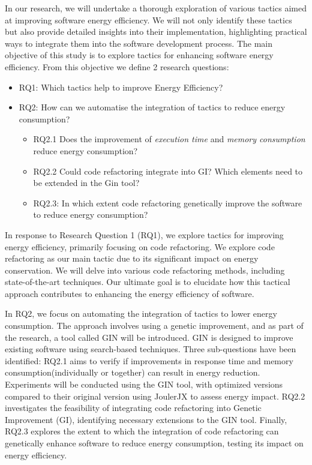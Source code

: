 In our research, we will undertake a thorough exploration of various tactics aimed at improving software energy efficiency. We will not only identify these tactics but also provide detailed insights into their implementation, highlighting practical ways to integrate them into the software development process. The main objective of this study is to explore tactics for enhancing software energy efficiency. From this objective we define 2 research questions:
\begin{itemize}
    \item RQ1: Which tactics help to improve Energy Efficiency?
    \item RQ2: How can we automatise the integration of tactics to reduce energy consumption?
    \begin{itemize}
    \item \small RQ2.1 Does the improvement of \textit{execution time} and  \textit{memory consumption} reduce energy consumption?
    \item \small RQ2.2 Could code refactoring integrate into GI? Which elements need to be extended in the Gin tool?
    \item \small RQ2.3: In which extent code refactoring genetically improve the software to reduce energy consumption?
  \end{itemize}
\end{itemize}

\vspace{-5pt}
In response to Research Question 1 (RQ1), we explore tactics for improving energy efficiency, primarily focusing on code refactoring. We explore code refactoring as our main tactic due to its significant impact on energy conservation. We will delve into various code refactoring methods, including state-of-the-art techniques. Our ultimate goal is to elucidate how this tactical approach contributes to enhancing the energy efficiency of software.\par

\vspace{.5em}
In RQ2, we focus on automating the integration of tactics to lower energy consumption. The approach involves using a genetic improvement, and as part of the research, a tool called GIN will be introduced. GIN is designed to improve existing software using search-based techniques. Three sub-questions have been identified: RQ2.1 aims to verify if improvements in response time and memory consumption(individually or together) can result in energy reduction. Experiments will be conducted using the GIN tool, with optimized versions compared to their original version using JoulerJX to assess energy impact. RQ2.2 investigates the feasibility of integrating code refactoring into Genetic Improvement (GI), identifying necessary extensions to the GIN tool. Finally, RQ2.3 explores the extent to which the integration of code refactoring can genetically enhance software to reduce energy consumption, testing its impact on energy efficiency.\par

